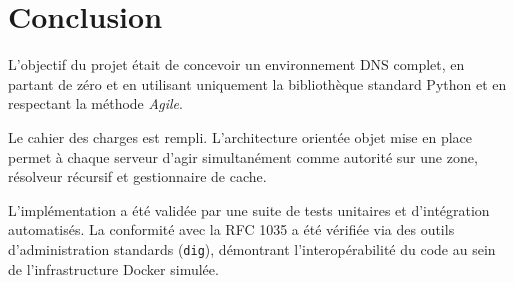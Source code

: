 \section*{Conclusion}
L'objectif du projet était de concevoir un environnement DNS complet, en partant de zéro et en utilisant uniquement la bibliothèque standard Python et en respectant la méthode \textit{Agile}.

Le cahier des charges est rempli. L'architecture orientée objet mise en place permet à chaque serveur d'agir simultanément comme autorité sur une zone, résolveur récursif et gestionnaire de cache.

L'implémentation a été validée par une suite de tests unitaires et d'intégration automatisés. La conformité avec la RFC 1035 a été vérifiée via des outils d'administration standards (\texttt{dig}), démontrant l'interopérabilité du code au sein de l'infrastructure Docker simulée.